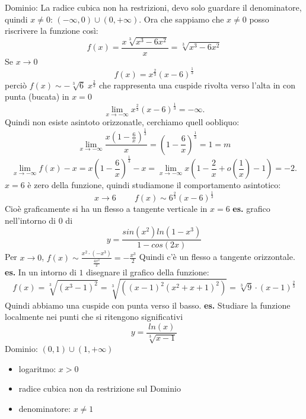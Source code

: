 Dominio: La radice cubica non ha restrizioni, devo solo guardare il denominatore, quindi $x\neq 0$: $(-\infty,0) \cup (0, +\infty)$.\newline
Ora che sappiamo che $x\neq0$ posso riscrivere la funzione così:
\[
    f(x) = \frac{x \sqrt[3]{x^3-6x^2}}{x} = \sqrt[3]{x^3-6x^2} 
\]
Se $x \rightarrow 0$
\[
    f(x) = x^{\frac{2}{3}}(x-6)^{\frac{1}{3}}
\]
perciò $f(x) \sim  -\sqrt[3]{6} \; x^{\frac{2}{3}}$ che rappresenta una cuspide rivolta verso l'alta in con punta (bucata) in $x=0$\newline
\[
    \lim_{x\rightarrow -\infty} x^{\frac{2}{3}}(x-6)^{\frac{1}{3}} = -\infty.
\]
Quindi non esiste asintoto orizzonatle, cerchiamo quell oobliquo:
\[
    \lim_{x\rightarrow -\infty} \frac{x(1- \frac{6}{x})^{\frac{1}{3}}}{x} =  (1- \frac{6}{x})^{\frac{1}{3}}  = 1 = m
\]
\[
    \lim_{x\rightarrow -\infty} f(x)-x =  x(1- \frac{6}{x})^{\frac{1}{3}} -x = \lim_{x\rightarrow -\infty} x( 1 - \frac{2}{x} + o(\frac{1}{x}) -1) = -2.
\]
$x=6$ è zero della funzione, quindi studiamone il comportamento asintotico:
\[
    x \rightarrow  6 \;\;\;\;\;\;\;\; f(x) \sim  6^{\frac{2}{3}}(x-6)^{\frac{1}{3}}
\]
Cioè graficamente si ha un flesso a tangente verticale in $x=6$\newline
\newline
\newline
\newline
\textbf{es.} grafico nell'intorno di $0$ di 
\[
    y = \frac{sin(x^2)ln(1-x^3)}{1-cos(2x)}
\]
Per $x \rightarrow  0$, $f(x) \sim \frac{x^2 \cdot (-x^3)}{\frac{4x^2}{2}} = - \frac{x^3}{2}$
Quindi c'è un flesso a tangente orizzontale.\newline
\newline
\newline
\newline
\textbf{es.} In un intorno di $1$ disegnare il grafico della funzione:
\[
    f(x) = \sqrt[3]{(x^3-1)^2} = \sqrt[3]{((x-1)^2(x^2+x+1)^2)}= \sqrt[3]{9} \cdot (x-1)^{\frac{2}{3}}
\]
Quindi abbiamo una cuspide con punta verso il basso.\newline
\newline
\newline
\newline
\textbf{es.} Studiare la funzione localmente nei punti che si ritengono significativi
\[
    y= \frac{ln(x)}{\sqrt[3]{x-1}}
\]
Dominio: $(0,1) \cup (1,+\infty)$
\begin{itemize}
    \item logaritmo: $x>0$
    \item radice cubica non da restrizione sul Dominio
    \item denominatore: $x\neq1$
\end{itemize}
